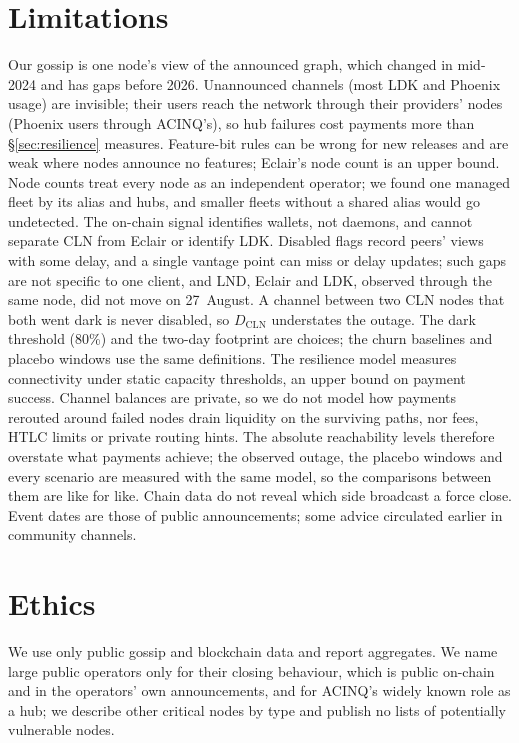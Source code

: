 \documentclass[conference]{IEEEtran}
\begin{document}
\section{Limitations}
\label{sec:limitations}
Our gossip is one node's view of the announced graph, which changed in mid-2024 and has gaps before 2026.
Unannounced channels (most LDK and Phoenix usage) are invisible; their users reach the network through their
providers' nodes (Phoenix users through ACINQ's), so hub failures cost payments more than \S\ref{sec:resilience}
measures. Feature-bit rules can be wrong for new releases and
are weak where nodes announce no features; Eclair's node count is an upper bound. Node counts treat every node as
an independent operator; we found one managed fleet by its alias and hubs, and smaller fleets without a shared
alias would go undetected. The on-chain signal identifies
wallets, not daemons, and cannot separate CLN from Eclair or identify LDK. Disabled flags record peers' views with
some delay, and a single vantage point can miss or delay updates; such gaps are not specific to one client, and
LND, Eclair and LDK, observed through the same node, did not move on 27~August. A channel between two CLN nodes
that both went dark is never disabled, so $D_{\mathrm{CLN}}$
understates the outage. The dark threshold (80\%) and the two-day footprint are choices; the churn baselines and
placebo windows use the same definitions. The resilience model measures connectivity under static capacity
thresholds, an upper bound on payment success. Channel balances are private, so we do not model how payments
rerouted around failed nodes drain liquidity on the surviving paths, nor fees, HTLC limits or private routing hints.
The absolute reachability levels therefore overstate what payments achieve; the observed outage, the placebo
windows and every scenario are measured with the same model, so the comparisons between them are like for like.
Chain data do not reveal which side broadcast a force close. Event dates are those of public announcements; some
advice circulated earlier in community channels.

\section{Ethics}
We use only public gossip and blockchain data and report aggregates. We name large public operators only for
their closing behaviour, which is public on-chain and in the operators' own announcements, and for ACINQ's widely
known role as a hub; we describe other critical nodes by type and publish no lists of potentially vulnerable nodes.
\end{document}
